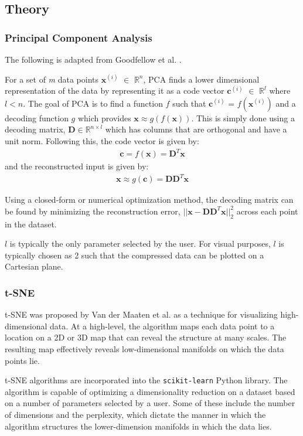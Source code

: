 \documentclass[12pt]{article}
\begin{document}
\subsection{Theory}
\subsubsection{Principal Component Analysis}
The following is adapted from Goodfellow et al. \cite{GoodBengCour16}.

For a set of \textit{m} data points $\textbf{x}^{(i)}$ $\in$ $\mathbb{R}^n$, PCA finds a lower dimensional representation of the data by representing it as a code vector $\textbf{c}^{(i)}$ $\in$ $\mathbb{R}^l$ where $l < n$. The goal of PCA is to find a function $f$ such that $\textbf{c}^{(i)}$ = $f(\textbf{x}^{(i)})$ and a decoding function $g$ which provides $\textbf{x} \approx g(f(\textbf{x}))$. This is simply done using a decoding matrix, $\textbf{D} \in \mathbb{R}^{n \times l}$ which has columns that are orthogonal and have a unit norm. Following this, the code vector is given by:
\begin{align*}
    \textbf{c} = f(\textbf{x}) = \textbf{D}^T\textbf{x}
\end{align*}
and the reconstructed input is given by:
\begin{align*}
    \textbf{x} \approx g(\textbf{c}) = \textbf{D}\textbf{D}^T\textbf{x}
\end{align*} 

Using a closed-form or numerical optimization method, the decoding matrix can be found by minimizing the reconstruction error, $||\textbf{x} - \textbf{D}\textbf{D}^T\textbf{x}||_2^2$ across each point in the dataset.
 
$l$ is typically the only parameter selected by the user. For visual purposes, $l$ is typically chosen as 2 such that the compressed data can be plotted on a Cartesian plane.

\subsubsection{t-SNE}
t-SNE was proposed by Van der Maaten et al. \cite{vanDerMaaten2008} as a technique for visualizing high-dimensional data. At a high-level, the algorithm maps each data point to a location on a 2D or 3D map that can reveal the structure at many scales. The resulting map effectively reveals low-dimensional manifolds on which the data points lie.

t-SNE algorithms are incorporated into the \verb|scikit-learn| Python library. The algorithm is capable of optimizing a dimensionality reduction on a dataset based on a number of parameters selected by a user. Some of these include the number of dimensions and the perplexity, which dictate the manner in which the algorithm structures the lower-dimension manifolds in which the data lies.
\end{document}
